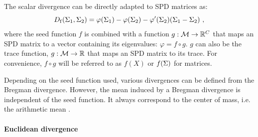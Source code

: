 The scalar divergence can be directly adapted to SPD matrices as:
\begin{equation}
\divB{f}(\P_1,\P_2) = \varphi(\P_1) - \varphi(\P_2) - \varphi'(\P_2)(\P_1 - \P_2) \ ,
\end{equation}
where the seed function $f$ is combined with a function $g: \GenMa \rightarrow \Re^\dc$ that maps an SPD matrix to a vector containing its eigenvalues: $\varphi = f \circ g$. 
$g$ can also be the trace function, $g: \GenMa \rightarrow \Re$ that maps an SPD matrix to its trace.
For convenience, $f \circ g$ will be referred to as $f(X)$ or $f(\P)$ for matrices. 

Depending on the seed function used, various divergences can be defined from the Bregman divergence. 
However, the mean induced by a Bregman divergence is independent of the seed function. 
It always correspond to the center of mass, i.e. the arithmetic mean \cite{nielsen_sided_2009}.
\\ \\ \textbf{Euclidean divergence} \\

